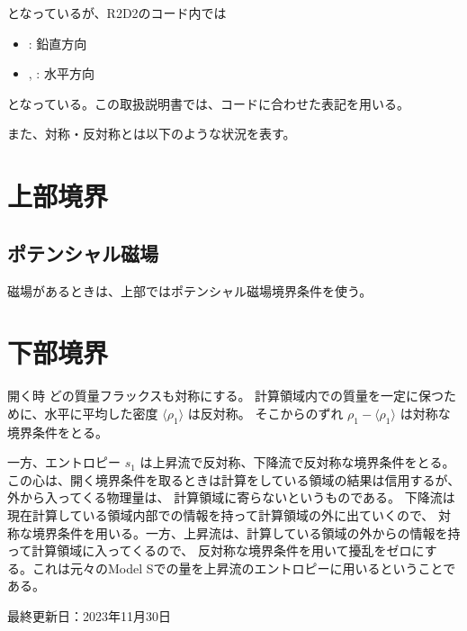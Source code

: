 \documentclass[letterpaper,10pt,dvipdfmx,report]{sphinxmanual}
\let\sphinxpxdimen\pdfpxdimen\else\newdimen\sphinxpxdimen
\begin{document}
\sphinxAtStartPar
となっているが、R2D2のコード内では
\begin{itemize}
\item {} 
\sphinxAtStartPar
{}: 鉛直方向

\item {} 
\sphinxAtStartPar
{}, : 水平方向

\end{itemize}

\sphinxAtStartPar
となっている。この取扱説明書では、コードに合わせた表記を用いる。

\sphinxAtStartPar
また、対称・反対称とは以下のような状況を表す。

\noindent\sphinxincludegraphics[width=450\sphinxpxdimen]{{bc_sym}.png}


\section{上部境界}
\label{\detokenize{boundary:id2}}

\subsection{ポテンシャル磁場}
\label{\detokenize{boundary:id3}}
\sphinxAtStartPar
磁場があるときは、上部ではポテンシャル磁場境界条件を使う。


\section{下部境界}
\label{\detokenize{boundary:id4}}
\sphinxAtStartPar
開く時
どの質量フラックスも対称にする。 計算領域内での質量を一定に保つために、水平に平均した密度
\(\langle \rho_1\rangle\) は反対称。 そこからのずれ
\(\rho_1 - \langle \rho_1 \rangle\) は対称な境界条件をとる。

\sphinxAtStartPar
一方、エントロピー \(s_1\) は上昇流で反対称、下降流で反対称な境界条件をとる。
この心は、開く境界条件を取るときは計算をしている領域の結果は信用するが、外から入ってくる物理量は、
計算領域に寄らないというものである。 下降流は現在計算している領域内部での情報を持って計算領域の外に出ていくので、
対称な境界条件を用いる。一方、上昇流は、計算している領域の外からの情報を持って計算領域に入ってくるので、
反対称な境界条件を用いて擾乱をゼロにする。これは元々のModel Sでの量を上昇流のエントロピーに用いるということである。

\sphinxAtStartPar
最終更新日：2023年11月30日
\end{document}
